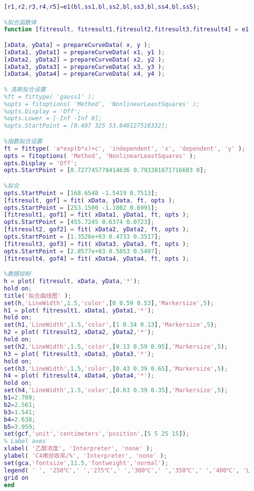 \documentclass[withoutpreface,bwprint]{cumcmthesis} %
\begin{document}
\begin{appendices}
\begin{lstlisting}[language=matlab]
%调用函数
[r1,r2,r3,r4,r5]=e1(bl,ss1,bl,ss2,bl,ss3,bl,ss4,bl,ss5);

%拟合函数体
function [fitresult, fitresult1,fitresult2,fitresult3,fitresult4] = e1( x, y, x1, y1, x2, y2, x3, y3, x4, y4) 

[xData, yData] = prepareCurveData( x, y );
[xData1, yData1] = prepareCurveData( x1, y1 );
[xData2, yData2] = prepareCurveData( x2, y2 );
[xData3, yData3] = prepareCurveData( x3, y3 );
[xData4, yData4] = prepareCurveData( x4, y4 );

% 高斯拟合设置
%ft = fittype( 'gauss1' );
%opts = fitoptions( 'Method', 'NonlinearLeastSquares' );
%opts.Display = 'Off';
%opts.Lower = [-Inf -Inf 0];
%opts.StartPoint = [0.497 325 53.840127518332];

%指数拟合设置
ft = fittype( 'a*exp(b*x)+c', 'independent', 'x', 'dependent', 'y' );
opts = fitoptions( 'Method', 'NonlinearLeastSquares' );
opts.Display = 'Off';
opts.StartPoint = [0.727745778414636 0.793381871716603 0];

%拟合
opts.StartPoint = [168.6548 -1.5419 0.7513];
[fitresult, gof] = fit( xData, yData, ft, opts );
opts.StartPoint = [253.1500 -1.1802 0.6991];
[fitresult1, gof1] = fit( xData1, yData1, ft, opts );
opts.StartPoint = [455.7245 0.6374 0.0723];
[fitresult2, gof2] = fit( xData2, yData2, ft, opts );
opts.StartPoint = [1.3526e+03 0.4733 0.3517];
[fitresult3, gof3] = fit( xData3, yData3, ft, opts );
opts.StartPoint = [2.8577e+03 0.5853 0.5497];
[fitresult4, gof4] = fit( xData4, yData4, ft, opts );

%数据绘制
h = plot( fitresult, xData, yData,'*');
hold on;
title('拟合曲线图' );
set(h,'LineWidth',1.5,'color',[0 0.59 0.53],'Markersize',5);
h1 = plot( fitresult1, xData1, yData1,'*');
hold on;
set(h1,'LineWidth',1.5,'color',[1 0.34 0.13],'Markersize',5);
h2 = plot( fitresult2, xData2, yData2,'*');
hold on;
set(h2,'LineWidth',1.5,'color',[0.13 0.59 0.95],'Markersize',5);
h3 = plot( fitresult3, xData3, yData3,'*');
hold on;
set(h3,'LineWidth',1.5,'color',[0.43 0.39 0.65],'Markersize',5);
h4 = plot( fitresult4, xData4, yData4,'*');
hold on;
set(h4,'LineWidth',1.5,'color',[0.63 0.39 0.35],'Markersize',5);
b1=2.709;
b2=2.561;
b3=1.541;
b4=2.638;
b5=3.959;
set(gcf,'unit','centimeters','position',[5 5 25 15]);
% Label axes
xlabel( '乙醇浓度', 'Interpreter', 'none' );
ylabel( 'C4烯烃收率/%', 'Interpreter', 'none' );
set(gca,'fontsize',11.5,'fontweight','normal');
legend( ' ', '250℃',' ','275℃',' ','300℃',' ','350℃',' ','400℃', 'Location', 'NorthWest', 'Interpreter', 'none' );
grid on
end	
\end{lstlisting}


\end{appendices}
\end{document}
